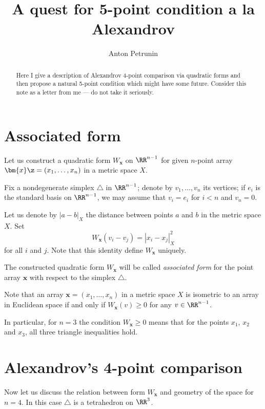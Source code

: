 \documentclass[oneside,a4paper]{amsart}
\begin{document}
\title{A quest for 5-point condition a la Alexandrov}
\author{Anton Petrunin}
\date{}
\begin{abstract}
Here I give a description of Alexandrov 4-point comparison
via quadratic forms
and then propose a natural 5-point condition which might have some future.
Consider this note as a letter from me --- do not take it seriously.
\end{abstract}
\maketitle

\section*{Associated form}

Let us construct a quadratic form $W_{\bm{x}}$ on $\RR^{n-1}$ 
for given $n$-point array $\bm{x}\z=(x_1,\dots,x_n)$ in a metric space $X$.

Fix a nondegenerate simplex $\triangle$ in $\RR^{n-1}$;
denote by $v_1,\dots,v_n$ its vertices;
if $e_i$ is the standard basis on $\RR^{n-1}$,
we may assume that $v_i=e_i$ for $i<n$ and $v_n=0$.

Let us denote by $|a-b|_X$ the distance between points $a$ and $b$ in the metric space $X$.
Set
\[W_{\bm{x}}(v_i-v_j)=|x_i-x_j|^2_X\] 
for all $i$ and $j$.
Note that this identity define $W_{\bm{x}}$ uniquely.


The constructed quadratic form $W_{\bm{x}}$ will be called \emph{associated form} for the point array $\bm{x}$ with respect to the simplex $\triangle$.

Note that an array $\bm{x}=(x_1,\dots,x_n)$ in a metric space $X$ is isometric to an array in Euclidean space if and only if 
$W_{\bm{x}}(v)\ge 0$
for any $v\in \RR^{n-1}$.

In particular, for $n=3$ the
condition $W_{\bm{x}}\ge 0$ means that for the points $x_1$, $x_2$ and $x_3$,
all three triangle inequalities hold. 

\section*{Alexandrov's 4-point comparison}

Now let us discuss the relation between form $W_{\bm{x}}$
and geometry of the space for $n=4$.
In this case $\triangle$ is a tetrahedron on $\RR^3$.
\end{document}
